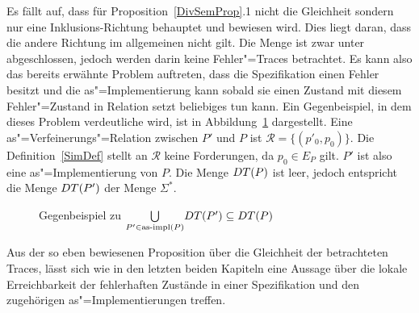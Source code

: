 Es fällt auf, dass für Proposition~\ref{DivSemProp}.1 nicht die Gleichheit
sondern nur eine Inklusions-Richtung behauptet und bewiesen wird. Dies liegt
daran, dass die andere Richtung im allgemeinen nicht gilt. Die Menge \DT{} ist
zwar unter \cont{} abgeschlossen, jedoch werden darin keine Fehler"=Traces
betrachtet. Es kann also das bereits erwähnte Problem auftreten, dass die
Spezifikation einen Fehler besitzt und die as"=Implementierung kann sobald sie
einen Zustand mit diesem Fehler"=Zustand in Relation setzt beliebiges tun kann.
Ein Gegenbeispiel, in dem dieses Problem verdeutliche wird, ist in
Abbildung~\ref{DTAsimpInDTGegenBsp} dargestellt. Eine
as"=Verfeinerungs"=Relation zwischen $P'$ und $P$ ist $\mathcal{R} =
\{(p'_0,p_0)\}$. Die Definition~\ref{SimDef} stellt an $\mathcal{R}$ keine
Forderungen, da $p_0\in E_P$ gilt. $P'$ ist also eine as"=Implementierung von
$P$. Die Menge $DT (P)$ ist leer, jedoch entspricht die Menge $DT (P')$ der
Menge $\Sigma ^*$.

\begin{figure}[htbp]
  \begin{center}
    \caption{Gegenbeispiel zu $\underset{P'\in\mathrm{as}\text{-}\mathrm{impl} (P)}{\bigcup} DT (P')
    \subseteq DT (P)$}
    \label{DTAsimpInDTGegenBsp}
  \end{center}
\end{figure}

Aus der so eben bewiesenen Proposition über die Gleichheit der betrachteten
Traces, lässt sich wie in den letzten beiden Kapiteln eine Aussage über die
lokale Erreichbarkeit der fehlerhaften Zustände in einer Spezifikation und den
zugehörigen as"=Implementierungen treffen.


